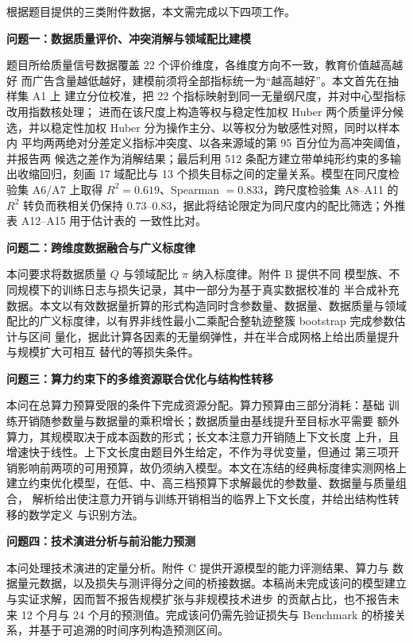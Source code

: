 \documentclass[bwprint]{gmcmthesis}
\numberwithin{equation}{section}
\numberwithin{figure}{section}
\numberwithin{table}{section}
\begin{document}

根据题目提供的三类附件数据，本文需完成以下四项工作。

\textbf{问题一：数据质量评价、冲突消解与领域配比建模}

题目所给质量信号数据覆盖 22 个评价维度，各维度方向不一致，教育价值越高越好
而广告含量越低越好，建模前须将全部指标统一为“越高越好”。本文首先在抽样集 A1 上
建立分位校准，把 22 个指标映射到同一无量纲尺度，并对中心型指标改用指数核处理；
进而在该尺度上构造等权与稳定性加权 Huber 两个质量评分候选，并以稳定性加权 Huber
分为操作主分、以等权分为敏感性对照，同时以样本内
平均两两绝对分差定义指标冲突度、以各来源域的第 95 百分位为高冲突阈值，并报告两
候选之差作为消解结果；最后利用 512 条配方建立带单纯形约束的多输出收缩回归，刻画
17 域配比与 13 个损失目标之间的定量关系。模型在同尺度检验集 A6/A7 上取得
$R^2=0.619$、Spearman $=0.833$，跨尺度检验集 A8--A11 的 $R^2$ 转负而秩相关仍保持
$0.73$--$0.83$，据此将结论限定为同尺度内的配比筛选；外推表 A12--A15 用于估计表的
一致性比对。

\textbf{问题二：跨维度数据融合与广义标度律}

本问要求将数据质量 $Q$ 与领域配比 $\pi$ 纳入标度律。附件 B 提供不同
模型族、不同规模下的训练日志与损失记录，其中一部分为基于真实数据校准的
半合成补充数据。本文以有效数据量折算的形式构造同时含参数量、数据量、数据质量与领域
配比的广义标度律，以有界非线性最小二乘配合整轨迹整簇 bootstrap 完成参数估计与区间
量化，据此计算各因素的无量纲弹性，并在半合成网格上给出质量提升与规模扩大可相互
替代的等损失条件。

\textbf{问题三：算力约束下的多维资源联合优化与结构性转移}

本问在总算力预算受限的条件下完成资源分配。算力预算由三部分消耗：基础
训练开销随参数量与数据量的乘积增长；数据质量由基线提升至目标水平需要
额外算力，其规模取决于成本函数的形式；长文本注意力开销随上下文长度
上升，且增速快于线性。上下文长度由题目外生给定，不作为寻优变量，但通过
第三项开销影响前两项的可用预算，故仍须纳入模型。本文在冻结的经典标度律实测网格上
建立约束优化模型，在低、中、高三档预算下求解最优的参数量、数据量与质量组合，
解析给出使注意力开销与训练开销相当的临界上下文长度，并给出结构性转移的数学定义
与识别方法。

\textbf{问题四：技术演进分析与前沿能力预测}

本问处理技术演进的定量分析。附件 C 提供开源模型的能力评测结果、算力与
数据量元数据，以及损失与测评得分之间的桥接数据。本稿尚未完成该问的模型建立与实证求解，因而暂不报告规模扩张与非规模技术进步
的贡献占比，也不报告未来 12 个月与 24 个月的预测值。完成该问仍需先验证损失与
Benchmark 的桥接关系，并基于可追溯的时间序列构造预测区间。
\end{document}
